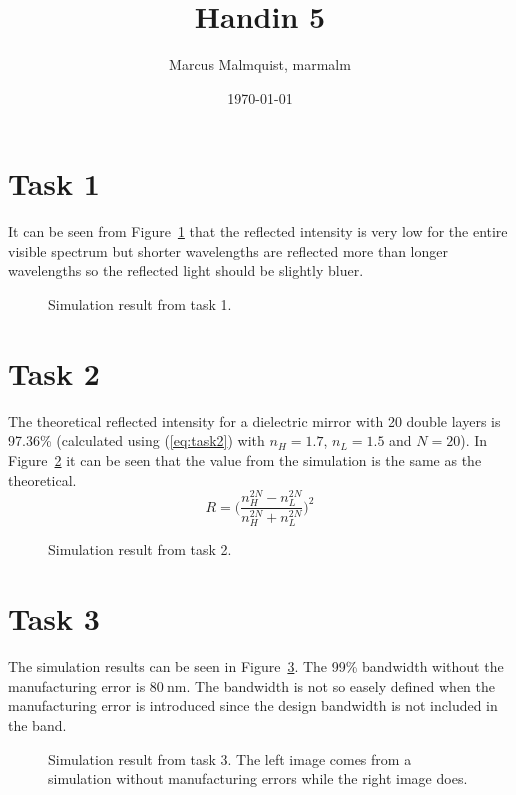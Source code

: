\documentclass[12pt,a4paper]{article}
\title{Handin 5}
\author{Marcus Malmquist, marmalm}
\date{\today}
\begin{document}
\maketitle

\section{Task 1}\label{sec:1}
It can be seen from Figure~\ref{fig:task1} that the reflected intensity is very low for the entire visible spectrum but shorter wavelengths are reflected more than longer wavelengths so the reflected light should be slightly bluer.
\begin{figure}[h]
  \centering
  \noindent\makebox[\textwidth]{\scalebox{0.90}{}}
  \caption{Simulation result from task 1.}
  \label{fig:task1}
\end{figure}

\section{Task 2}\label{sec:2}
The theoretical reflected intensity for a dielectric mirror with 20 double layers is 97.36\% (calculated using (\ref{eq:task2}) with $n_H=1.7$, $n_L=1.5$ and $N=20$). In Figure~\ref{fig:task2} it can be seen that the value from the simulation is the same as the theoretical.
\begin{equation}
  \label{eq:task2}
  R=\Big(\frac{n_H^{2N}-n_L^{2N}}{n_H^{2N}+n_L^{2N}}\Big)^2
\end{equation}
\begin{figure}[h]
  \centering
  \noindent\makebox[\textwidth]{\scalebox{0.90}{}}
  \caption{Simulation result from task 2.}
  \label{fig:task2}
\end{figure}

\section{Task 3}\label{sec:3}
The simulation results can be seen in Figure~\ref{fig:task3}. The 99\% bandwidth without the manufacturing error is $\SI{80}{\nano\metre}$. The bandwidth is not so easely defined when the manufacturing error is introduced since the design bandwidth is not included in the band.
\begin{figure}[h]
  \centering
  \noindent\makebox[\textwidth]{\scalebox{0.70}{}}
  \caption{Simulation result from task 3. The left image comes from a simulation without manufacturing errors while the right image does.}
  \label{fig:task3}
\end{figure}
\end{document}
